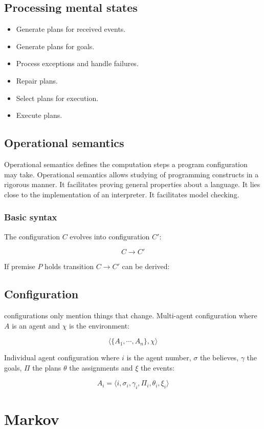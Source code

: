 \documentclass{article}
\begin{document}
\subsection{Processing mental states}

\begin{itemize}
	\item Generate plans for received events.
	\item Generate plans for goals.
	\item Process exceptions and handle failures.
	\item Repair plans.
	\item Select plans for execution.
	\item Execute plans.
\end{itemize}

\subsection{Operational semantics}
Operational semantics defines the computation steps a program
configuration may take. Operational semantics allows studying
of programming constructs in a rigorous manner. It facilitates proving
general properties about a language. It lies close to the implementation
of an interpreter. It facilitates model checking.

\subsubsection{Basic syntax}
The configuration $C$ evolves into configuration $C'$:

\[C \to C'\]

If premise $P$ holds transition $C \to C'$ can be derived:

\begin{prooftree}
\end{prooftree}

\subsection{Configuration}
configurations only mention things that change.
Multi-agent configuration where $A$ is an agent and $\chi$ is the
environment:

\[\langle \{A_1, \cdots, A_n\}, \chi\rangle \]

Individual agent configuration where $i$ is the agent number, $\sigma$ the
believes, $\gamma$ the goals, $\Pi$ the plans $\theta$ the assignments and
$\xi$ the events:

\[A_i = \langle i, \sigma_i, \gamma_i, \Pi_i, \theta_i, \xi_i \rangle \]

\section{Markov}
\end{document}
